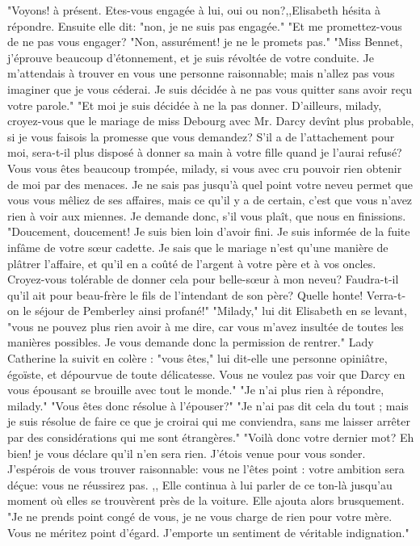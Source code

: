 "Voyons! à présent. Etes-vous engagée à lui, oui ou non?,,Elisabeth hésita à répondre. Ensuite elle dit: "non, je ne suis pas engagée."
"Et me promettez-vous de ne pas vous engager?
"Non, assurément! je ne le promets pas."
"Miss Bennet, j'éprouve beaucoup d'étonnement, et je suis révoltée de votre conduite. Je m'attendais à trouver en vous une personne raisonnable; mais n'allez pas vous imaginer que je vous céderai. Je suis décidée à ne pas vous quitter sans avoir reçu votre parole."
"Et moi je suis décidée à ne la pas donner. D'ailleurs, milady, croyez-vous que le mariage de miss Debourg avec Mr. Darcy devînt plus probable, si je vous faisois la promesse que vous demandez? S'il a de l'attachement pour moi, sera-t-il plus disposé à donner sa main à votre fille quand je l'aurai refusé? Vous vous êtes beaucoup trompée, milady, si vous avec cru pouvoir rien\setcounter{page}{259} obtenir de moi par des menaces. Je ne sais pas jusqu'à quel point votre neveu permet que vous vous mêliez de ses affaires, mais ce qu'il y a de certain, c'est que vous n'avez rien à voir aux miennes. Je demande donc, s'il vous plaît, que nous en finissions.
"Doucement, doucement! Je suis bien loin d'avoir fini. Je suis informée de la fuite infâme de votre sœur cadette. Je sais que le mariage n'est qu'une manière de plâtrer l'affaire, et qu'il en a coûté de l'argent à votre père et à vos oncles. Croyez-vous tolérable de donner cela pour belle-sœur à mon neveu? Faudra-t-il qu'il ait pour beau-frère le fils de l'intendant de son père? Quelle honte! Verra-t-on le séjour de Pemberley ainsi profané!"
"Milady," lui dit Elisabeth en se levant, "vous ne pouvez plus rien avoir à me dire, car vous m'avez insultée de toutes les manières possibles. Je vous demande donc la permission de rentrer."
Lady Catherine la suivit en colère : "vous êtes," lui dit-elle une personne opiniâtre, égoïste, et dépourvue de toute délicatesse. Vous ne voulez pas voir que Darcy en vous épousant se brouille avec tout le monde."
"Je n'ai plus rien à répondre, milady."
"Vous êtes donc résolue à l'épouser?"
\setcounter{page}{260}
"Je n'ai pas dit cela du tout ; mais je suis résolue de faire ce que je croirai qui me conviendra, sans me laisser arrêter par des considérations qui me sont étrangères."
"Voilà donc votre dernier mot? Eh bien! je vous déclare qu'il n'en sera rien. J'étois venue pour vous sonder. J'espérois de vous trouver raisonnable: vous ne l'êtes point : votre ambition sera déçue: vous ne réussirez pas. ,, Elle continua à lui parler de ce ton-là jusqu'au moment où elles se trouvèrent près de la voiture. Elle ajouta alors brusquement. "Je ne prends point congé de vous, je ne vous charge de rien pour votre mère. Vous ne méritez point d'égard. J'emporte un sentiment de véritable indignation."
